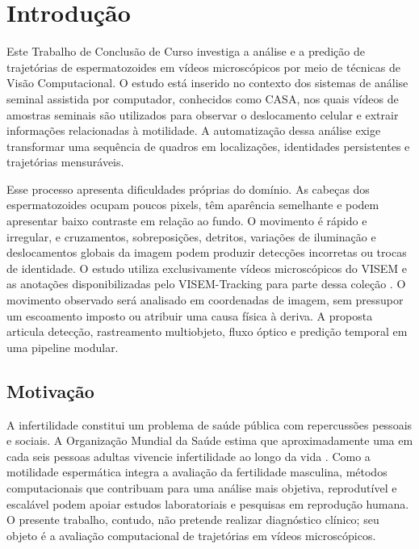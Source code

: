 \chapter[Introdução]{Introdução}

Este Trabalho de Conclusão de Curso investiga a análise e a predição de trajetórias de espermatozoides em vídeos microscópicos por meio de técnicas de Visão Computacional. O estudo está inserido no contexto dos sistemas de análise seminal assistida por computador, conhecidos como \ac{CASA}, nos quais vídeos de amostras seminais são utilizados para observar o deslocamento celular e extrair informações relacionadas à motilidade. A automatização dessa análise exige transformar uma sequência de quadros em localizações, identidades persistentes e trajetórias mensuráveis.

Esse processo apresenta dificuldades próprias do domínio. As cabeças dos espermatozoides ocupam poucos pixels, têm aparência semelhante e podem apresentar baixo contraste em relação ao fundo. O movimento é rápido e irregular, e cruzamentos, sobreposições, detritos, variações de iluminação e deslocamentos globais da imagem podem produzir detecções incorretas ou trocas de identidade. O estudo utiliza exclusivamente vídeos microscópicos do VISEM e as anotações disponibilizadas pelo VISEM-Tracking para parte dessa coleção \cite{haugen2019visem,thambawita2023visemtracking}. O movimento observado será analisado em coordenadas de imagem, sem pressupor um escoamento imposto ou atribuir uma causa física à deriva. A proposta articula detecção, rastreamento multiobjeto, fluxo óptico e predição temporal em uma pipeline modular.

\section{Motivação}

A infertilidade constitui um problema de saúde pública com repercussões pessoais e sociais. A Organização Mundial da Saúde estima que aproximadamente uma em cada seis pessoas adultas vivencie infertilidade ao longo da vida \cite{who2023infertility}. Como a motilidade espermática integra a avaliação da fertilidade masculina, métodos computacionais que contribuam para uma análise mais objetiva, reprodutível e escalável podem apoiar estudos laboratoriais e pesquisas em reprodução humana. O presente trabalho, contudo, não pretende realizar diagnóstico clínico; seu objeto é a avaliação computacional de trajetórias em vídeos microscópicos.

